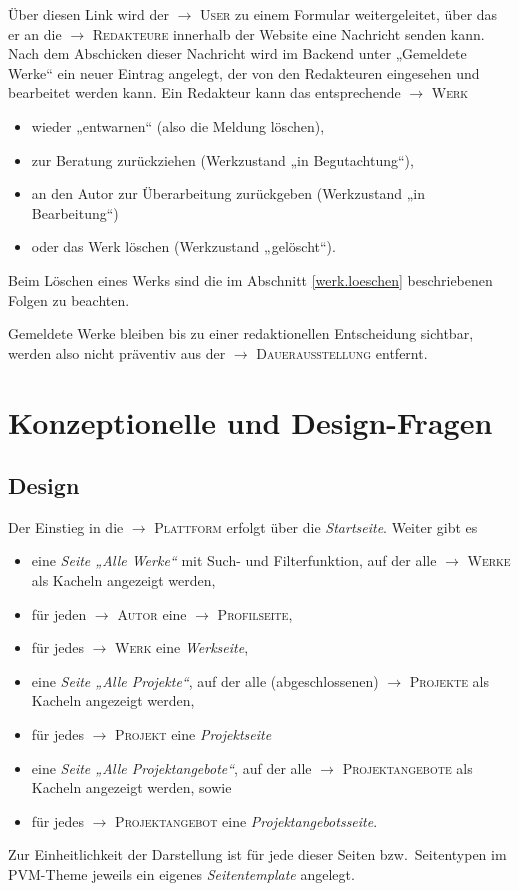 \documentclass[a4paper,11pt]{article}
\newcommand{\glossar}[1]{{$\to$ \textsc{#1}}}
\begin{document}
Über diesen Link wird der \glossar{User} zu einem Formular weitergeleitet, über
das er an die \glossar{Redakteure} innerhalb der Website eine Nachricht senden
kann. Nach dem Abschicken dieser Nachricht wird im Backend unter „Gemeldete
Werke“ ein neuer Eintrag angelegt, der von den Redakteuren eingesehen und
bearbeitet werden kann. Ein Redakteur kann das entsprechende \glossar{Werk}
\begin{itemize}
\item wieder „entwarnen“ (also die Meldung löschen), 
\item zur Beratung zurückziehen (Werkzustand „in Begutachtung“),
\item an den Autor zur Überarbeitung zurückgeben (Werkzustand „in Bearbeitung“)
\item oder das Werk löschen (Werkzustand „gelöscht“). 
\end{itemize}
Beim Löschen eines Werks sind die im Abschnitt \ref{werk.loeschen}
beschriebenen Folgen zu beachten.

Gemeldete Werke bleiben bis zu einer redaktionellen Entscheidung sichtbar,
werden also nicht präventiv aus der \glossar{Dauerausstellung} entfernt.
  
\section{Konzeptionelle und Design-Fragen}

\subsection{Design}

Der Einstieg in die \glossar{Plattform} erfolgt über die \emph{Startseite}.
Weiter gibt es 
\begin{itemize}\itemsep0pt
\item eine \emph{Seite „Alle Werke“} mit Such- und Filterfunktion, auf der alle
  \glossar{Werke} als Kacheln angezeigt werden,
\item für jeden \glossar{Autor} eine \glossar{Profilseite}, 
\item für jedes \glossar{Werk} eine \emph{Werkseite},
\item eine \emph{Seite „Alle Projekte“}, auf der alle (abgeschlossenen)
  \glossar{Projekte} als Kacheln angezeigt werden, 
\item für jedes \glossar{Projekt} eine \emph{Projektseite}
\item eine \emph{Seite „Alle Projektangebote“}, auf der alle
  \glossar{Projektangebote} als Kacheln angezeigt werden, sowie
\item für jedes \glossar{Projektangebot} eine \emph{Projektangebotsseite}. 
\end{itemize}
Zur Einheitlichkeit der Darstellung ist für jede dieser Seiten
bzw.\ Seitentypen im PVM-Theme jeweils ein eigenes \emph{Seitentemplate}
angelegt.
\end{document}
